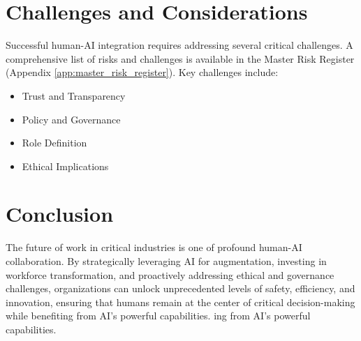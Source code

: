 \section{Challenges and Considerations}

Successful human-AI integration requires addressing several critical challenges. A comprehensive list of risks and challenges is available in the Master Risk Register (Appendix \ref{app:master_risk_register}). Key challenges include:

\begin{itemize}
    \item Trust and Transparency
    \item Policy and Governance
    \item Role Definition
    \item Ethical Implications
\end{itemize}



\section{Conclusion}
The future of work in critical industries is one of profound human-AI collaboration. By strategically leveraging AI for augmentation, investing in workforce transformation, and proactively addressing ethical and governance challenges, organizations can unlock unprecedented levels of safety, efficiency, and innovation, ensuring that humans remain at the center of critical decision-making while benefiting from AI's powerful capabilities.
ing from AI's powerful capabilities.
